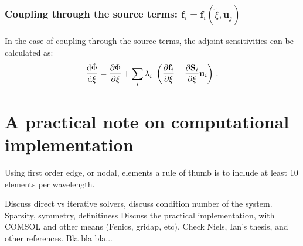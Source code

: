 \subsubsection*{Coupling through the source terms: $\mathbf{f}_i = \mathbf{f}_i(\bar{\tilde{\xi}}, \mathbf{u}_j)$}


In the case of coupling through the source terms, the adjoint sensitivities can be calculated as:
\begin{equation}
    \frac{\mathop{}\!\text{d} \tilde{\Phi}}{\mathop{}\!\text{d} \xi} = \frac{\partial \Phi}{\partial \xi} + \sum_i \lambda_{i}^{\top} \left( \frac{\partial \mathbf{f}_i}{\partial \xi} - \frac{\partial \mathbf{S}_i}{\partial \xi} \mathbf{u}_i  \right)\,.
\end{equation}

\section{A practical note on computational implementation}

Using first order edge, or nodal, elements a rule of thumb is to include at least 10 elements per wavelength.

Discuss direct vs iterative solvers, discuss condition number of the system.
Sparsity, symmetry, definitiness
Discuss the practical implementation, with COMSOL and other means (Fenics, gridap, etc).
Check Niels, Ian's thesis, and other references.
Bla bla bla...